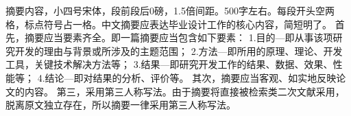 \begin{abstractc}
摘要内容，小四号宋体，段前段后0磅，1.5倍间距。500字左右。每段开头空两格，标点符号占一格。中文摘要应表达毕业设计工作的核心内容，简短明了。
首先，摘要应当要素齐全。即一篇摘要应当包含如下要素：
1.目的—即从事该项研究开发的理由与背景或所涉及的主题范围；
2.方法—即所用的原理、理论、开发工具，关键技术解决方法等；
3.结果—即研究开发工作的结果、数据、效果、性能等；
4.结论—即对结果的分析、评价等。
其次，摘要应当客观、如实地反映论文的内容。
第三，采用第三人称写法。由于摘要将直接被检索类二次文献采用，脱离原文独立存在，所以摘要一律采用第三人称写法。

\end{abstractc}
